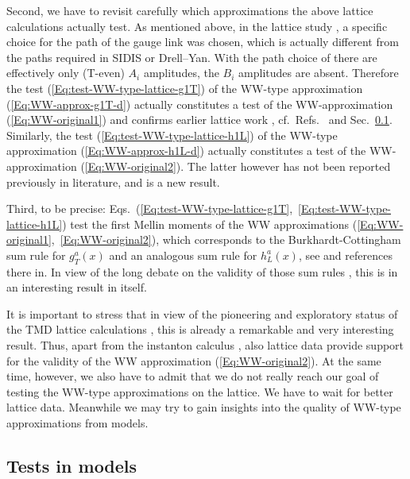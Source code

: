 \documentclass[a4paper,11pt]{article}
\begin{document}
Second, we have to revisit carefully which approximations the above
lattice calculations actually test. As mentioned above, in
the lattice study \cite{Hagler:2009mb,Musch:2010ka}, a specific choice for
the path of the gauge link was chosen, which is actually different
from the paths required in SIDIS or Drell--Yan. With the path choice of
\cite{Hagler:2009mb,Musch:2010ka} there are effectively only (T-even)
$A_i$ amplitudes, the $B_i$ amplitudes are absent.
Therefore the test (\ref{Eq:test-WW-type-lattice-g1T}) of the WW-type
approximation (\ref{Eq:WW-approx-g1T-d}) actually constitutes a test
of the WW-approximation (\ref{Eq:WW-original1}) and confirms
earlier lattice work \cite{Gockeler:2000ja,Gockeler:2005vw},
cf.\ Refs.~\cite{Metz:2008ib,Teckentrup:2009tk} and
Sec.~\ref{Sec-3.6:models}.
Similarly, the test (\ref{Eq:test-WW-type-lattice-h1L}) of the
WW-type approximation (\ref{Eq:WW-approx-h1L-d}) actually constitutes
a test of the WW-approximation (\ref{Eq:WW-original2}). The latter
however has not been reported previously in literature, and is a
new result.

Third, to be precise:
Eqs.~(\ref{Eq:test-WW-type-lattice-g1T},~\ref{Eq:test-WW-type-lattice-h1L})
test the first Mellin moments of the WW approximations
(\ref{Eq:WW-original1},~\ref{Eq:WW-original2}), which corresponds to the
Burkhardt-Cottingham sum rule for $g_T^a(x)$ and an analogous sum rule for
$h_L^a(x)$, see \cite{Jaffe:1996zw} and references there in.
In view of the long debate on the validity of those sum rules
\cite{Burkardt:2001iy,Bass:2003vp,Efremov:2002qh}, this is in
an interesting result in itself.

It is important to stress that in view of the pioneering and
exploratory status of the TMD lattice calculations
\cite{Hagler:2009mb,Musch:2010ka}, this is already a remarkable and very
interesting result. Thus, apart from the instanton calculus
\cite{Dressler:1999hc}, also lattice data provide support for
the validity of the WW approximation (\ref{Eq:WW-original2}).
At the same time, however, we also have to admit that we do
not really reach our goal of testing the WW-type approximations
on the lattice. We have to wait for better lattice data. 
Meanwhile we may try to gain insights into the quality of
WW-type approximations from models.




\subsection{Tests in models}
\label{Sec-3.6:models}
\end{document}
